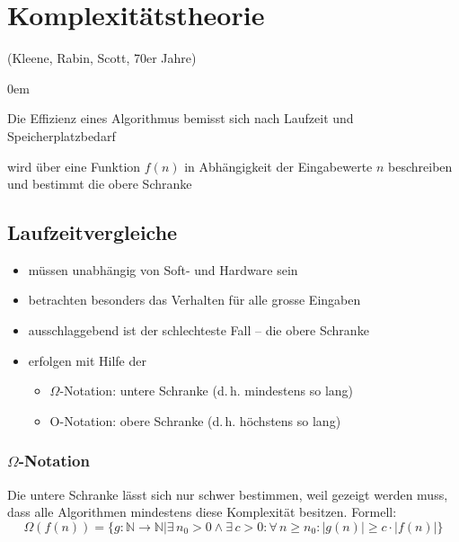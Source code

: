 \section{Komplexitätstheorie}
(Kleene, Rabin, Scott, 70er Jahre)
\begin{description}\itemsep0em
	\item [Effizienz] Die Effizienz eines Algorithmus bemisst sich nach Laufzeit und Speicherplatzbedarf
	\item [Laufzeiteffizienz] 
	wird über eine Funktion $f(n)$ in Abhängigkeit der Eingabewerte $n$ beschreiben und bestimmt die obere Schranke
\end{description}

\subsection{Laufzeitvergleiche}
\begin{itemize}\itemsep0em
	\item müssen unabhängig von Soft- und Hardware sein
	\item betrachten besonders das Verhalten für alle grosse Eingaben
	\item ausschlaggebend ist der schlechteste Fall -- die obere Schranke
	\item erfolgen mit Hilfe der 
	\begin{itemize}
		\item $\Omega$-Notation: untere Schranke (d.\,h. mindestens so lang)
		\item O-Notation: obere Schranke (d.\,h. höchstens so lang) 
	\end{itemize}
\end{itemize}

\subsubsection{$\Omega$-Notation}
Die untere Schranke lässt sich nur schwer bestimmen, weil gezeigt werden muss, dass alle Algorithmen mindestens diese Komplexität besitzen. Formell:
\begin{equation*}
	\Omega(f(n)) = \{g: \mathbb{N} \to \mathbb{N} | \exists\, n_0 > 0 \wedge \exists\, c > 0 : \forall\, n \geq n_0 : |g(n)| \geq c \cdot |f(n)|\}
\end{equation*}



